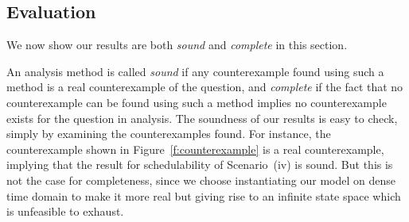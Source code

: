 \documentclass[10pt,journal]{IEEEtran}
\begin{document}
\begin{figure*}[!t]
\caption{A counterexample of schedulablity in Scenario~(iv). Each job
  of each task executes for the maximum of its computation
  requirement. The first job of $\tau_3$ misses its deadline at time
  $15ms$, which is the initiation time for the second job of
  $\tau_3$.}
\label{f:counterexample}
\end{figure*}

\subsection{Evaluation}
We now show our results are both \emph{sound} and \emph{complete} in
this section.

An analysis method is called \emph{sound} if any counterexample found
using such a method is a real counterexample of the question, and
\emph{complete} if the fact that no counterexample can be found using
such a method implies no counterexample exists for the question in
analysis. The soundness of our results is easy to check, simply by
examining the counterexamples found. For instance, the counterexample
shown in Figure~\ref{f:counterexample} is a real counterexample,
implying that the result for schedulability of Scenario~(iv) is
sound. But this is not the case for completeness, since we choose
instantiating our model on dense time domain to make it more real but
giving rise to an infinite state space which is unfeasible to exhaust.
\end{document}
